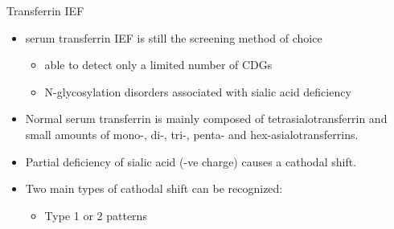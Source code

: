 \documentclass[presentation, smaller]{beamer}
\begin{document}
\begin{frame}[label={sec:org80437e8}]{Transferrin IEF}
\begin{itemize}
\item serum transferrin IEF is still the screening method of choice
\begin{itemize}
\item able to detect only a limited number of CDGs
\item N-glycosylation disorders associated with sialic acid deficiency
\end{itemize}

\item Normal serum transferrin is mainly composed of tetrasialotransferrin
and small amounts of mono-, di-, tri-, penta- and
hex-asialotransferrins.

\item Partial deficiency of sialic acid (-ve charge) causes a
cathodal shift.

\item Two main types of cathodal shift can be recognized:
\begin{itemize}
\item Type 1 or 2 patterns
\end{itemize}
\end{itemize}
\end{frame}
\end{document}
